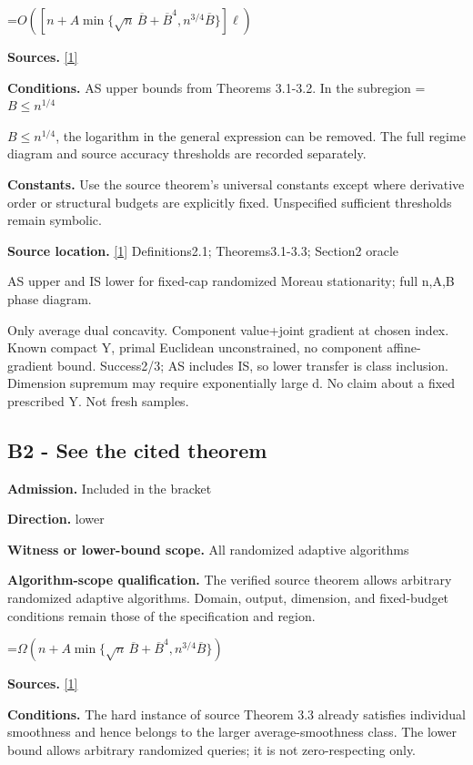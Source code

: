 \documentclass[10pt,a4paper]{article}
\newcommand{\AtlasMath}[1]{\par\begingroup\centering\setbox0=\hbox{$\displaystyle #1$}\ifdim\wd0>1.4\linewidth\typeout{ATLAS WIDE FORMULA: \the\wd0}\fi\ifdim\wd0>\linewidth\resizebox{\linewidth}{!}{\box0}\else\box0\fi\par\endgroup}
\newcommand{\AtlasInlineMath}[1]{\begingroup\setbox0=\hbox{$#1$}\ifdim\wd0>.4\linewidth\endgroup\AtlasMath{#1}\else\endgroup$#1$\fi}
\begin{document}
\AtlasMath{O\!\left([n+A\min\{\sqrt n\,\overline B+\overline B^4,n^{3/4}\overline B\}]\ell\right)}
\textbf{Sources.} \href{https://arxiv.org/pdf/2610.16991v2}{[1]}

\textbf{Conditions.} AS upper bounds from Theorems 3.1-3.2. In the subregion \AtlasInlineMath{B\le n^{1/4}}, the logarithm in the general expression can be removed. The full regime diagram and source accuracy thresholds are recorded separately.

\textbf{Constants.} Use the source theorem’s universal constants except where derivative order or structural budgets are explicitly fixed. Unspecified sufficient thresholds remain symbolic.

\textbf{Source location.} \href{https://arxiv.org/pdf/2610.16991v2}{[1]} Definitions2.1; Theorems3.1-3.3; Section2 oracle

AS upper and IS lower for fixed-cap randomized Moreau stationarity; full n,A,B phase diagram.

Only average dual concavity. Component value+joint gradient at chosen index. Known compact Y, primal Euclidean unconstrained, no component affine-gradient bound. Success2/3; AS includes IS, so lower transfer is class inclusion. Dimension supremum may require exponentially large d. No claim about a fixed prescribed Y. Not fresh samples.

\subsection{B2 - See the cited theorem}
\textbf{Admission.} Included in the bracket

\textbf{Direction.} lower

\textbf{Witness or lower-bound scope.} All randomized adaptive algorithms

\textbf{Algorithm-scope qualification.} The verified source theorem allows arbitrary randomized adaptive algorithms. Domain, output, dimension, and fixed-budget conditions remain those of the specification and region.

\AtlasMath{\Omega\!\left(n+A\min\{\sqrt n\,\overline B+\overline B^4,n^{3/4}\overline B\}\right)}
\textbf{Sources.} \href{https://arxiv.org/pdf/2610.16991v2}{[1]}

\textbf{Conditions.} The hard instance of source Theorem 3.3 already satisfies individual smoothness and hence belongs to the larger average-smoothness class. The lower bound allows arbitrary randomized queries; it is not zero-respecting only.
\end{document}
